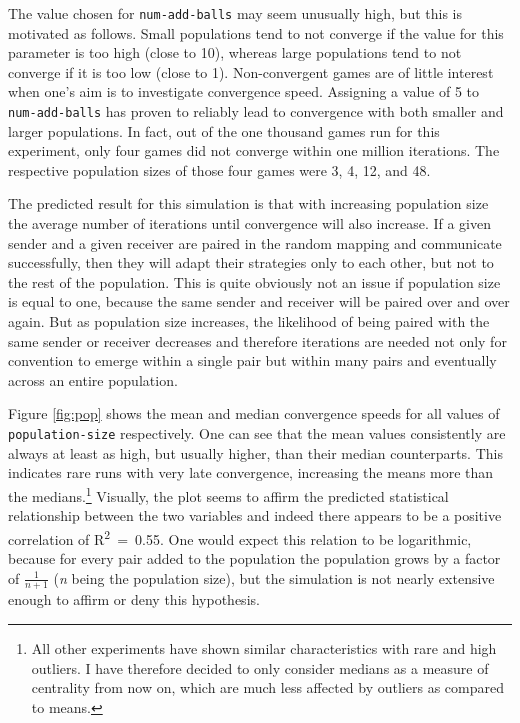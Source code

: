 \documentclass[
	DIV=calc,
	BCOR=0mm,
	pagesize,
	titlepage
]{scrartcl}
\newcommand{\code}[1]{\texttt{#1}}
\begin{document}
The value chosen for \code{num-add-balls} may seem unusually high, but this is motivated as follows.
Small populations tend to not converge if the value for this parameter is too high (close to 10), whereas large populations tend to not converge if it is too low (close to 1).
Non-convergent games are of little interest when one's aim is to investigate convergence speed.
Assigning a value of 5 to \code{num-add-balls} has proven to reliably lead to convergence with both smaller and larger populations.
In fact, out of the one thousand games run for this experiment, only four games did not converge within one million iterations.
The respective population sizes of those four games were 3, 4, 12, and 48.

The predicted result for this simulation is that with increasing population size the average number of iterations until convergence will also increase.
If a given sender and a given receiver are paired in the random mapping and communicate successfully, then they will adapt their strategies only to each other, but not to the rest of the population.
This is quite obviously not an issue if population size is equal to one, because the same sender and receiver will be paired over and over again.
But as population size increases, the likelihood of being paired with the same sender or receiver decreases and therefore iterations are needed not only for convention to emerge within a single pair but within many pairs and eventually across an entire population.

Figure \ref{fig:pop} shows the mean and median convergence speeds for all values of \code{population-size} respectively.
One can see that the mean values consistently are always at least as high, but usually higher, than their median counterparts.
This indicates rare runs with very late convergence, increasing the means more than the medians.\footnote{All other experiments have shown similar characteristics with rare and high outliers. I have therefore decided to only consider medians as a measure of centrality from now on, which are much less affected by outliers as compared to means.}
Visually, the plot seems to affirm the predicted statistical relationship between the two variables and indeed there appears to be a positive correlation of R\textsuperscript{2}~=~0.55.
One would expect this relation to be logarithmic, because for every pair added to the population the population grows by a factor of \(\frac{1}{n+1}\) (\textit{n} being the population size), but the simulation is not nearly extensive enough to affirm or deny this hypothesis.
\end{document}
